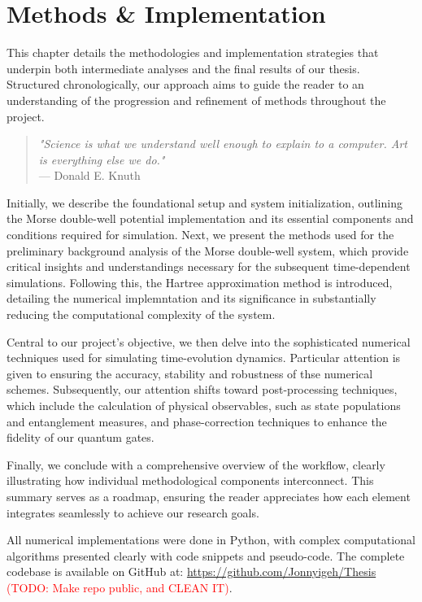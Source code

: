 \documentclass{subfiles}
\begin{document}
\chapter{Methods \& Implementation}\label{chap:3}
This chapter details the methodologies and implementation strategies that underpin both intermediate analyses and the final results of our thesis. Structured chronologically, our approach aims to guide the reader to an understanding of the progression and refinement of methods throughout the project. 

\begin{quote}
    \centering
    \textit{"Science is what we understand well enough to explain to a computer. Art is everything else we do."}\\
    \vspace{0.2cm}
    --- Donald E. Knuth
\end{quote}


Initially, we describe the foundational setup and system initialization, outlining the Morse double-well potential implementation and its essential components and conditions required for simulation. Next, we present the methods used for the preliminary background analysis of the Morse double-well system, which provide critical insights and understandings necessary for the subsequent time-dependent simulations. Following this, the Hartree approximation method is introduced, detailing the numerical implemntation and its significance in substantially reducing the computational complexity of the system.

Central to our project's objective, we then delve into the sophisticated numerical techniques used for simulating time-evolution dynamics. Particular attention is given to ensuring the accuracy, stability and robustness of thse numerical schemes. Subsequently, our attention shifts toward post-processing techniques, which include the calculation of physical observables, such as state populations and entanglement measures, and phase-correction techniques to enhance the fidelity of our quantum gates.

Finally, we conclude with a comprehensive overview of the workflow, clearly illustrating how individual methodological components interconnect. This summary serves as a roadmap, ensuring the reader appreciates how each element integrates seamlessly to achieve our research goals.

All numerical implementations were done in Python, with complex computational algorithms presented clearly with code snippets and pseudo-code. The complete codebase is available on GitHub at: \url{https://github.com/Jonnyigeh/Thesis} \textcolor{red}{(TODO: Make repo public, and CLEAN IT)}.
\newpage






\end{document}
